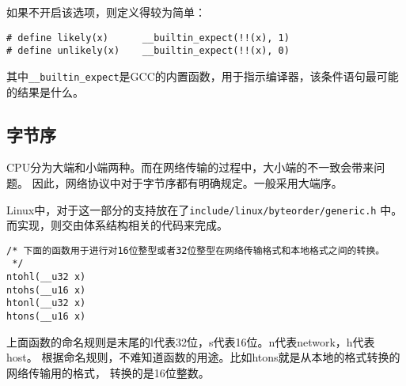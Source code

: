 如果不开启该选项，则定义得较为简单：
\begin{verbatim}
# define likely(x)      __builtin_expect(!!(x), 1)
# define unlikely(x)    __builtin_expect(!!(x), 0)
\end{verbatim}
其中\texttt{__builtin_expect}是GCC的内置函数，用于指示编译器，该条件语句最可能的结果是什么。

\subsection{字节序}
CPU分为大端和小端两种。而在网络传输的过程中，大小端的不一致会带来问题。
因此，网络协议中对于字节序都有明确规定。一般采用大端序。

Linux中，对于这一部分的支持放在了\texttt{include/linux/byteorder/generic.h}
中。而实现，则交由体系结构相关的代码来完成。

\begin{verbatim}
/* 下面的函数用于进行对16位整型或者32位整型在网络传输格式和本地格式之间的转换。
 */
ntohl(__u32 x)
ntohs(__u16 x)
htonl(__u32 x)
htons(__u16 x)
\end{verbatim}

上面函数的命名规则是末尾的l代表32位，s代表16位。n代表network，h代表host。
根据命名规则，不难知道函数的用途。比如htons就是从本地的格式转换的网络传输用的格式，
转换的是16位整数。
